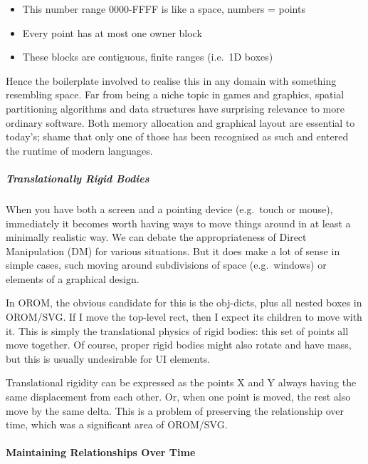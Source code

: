\documentclass[english,submission]{programming}
\begin{document}
\begin{itemize}
\tightlist
\item
  This number range 0000-FFFF is like a space, numbers = points
\item
  Every point has at most one owner block
\item
  These blocks are contiguous, finite ranges (i.e.~1D boxes)
\end{itemize}

Hence the boilerplate involved to realise this in any domain with
something resembling space. Far from being a niche topic in games and
graphics, spatial partitioning algorithms and data structures have
surprising relevance to more ordinary software. Both memory allocation
and graphical layout are essential to today's; shame that only one of
those has been recognised as such and entered the runtime of modern
languages.

\hypertarget{translationally-rigid-bodies}{%
\subparagraph{Translationally Rigid
Bodies}\label{translationally-rigid-bodies}}

When you have both a screen and a pointing device (e.g.~touch or mouse),
immediately it becomes worth having ways to move things around in at
least a minimally realistic way. We can debate the appropriateness of
Direct Manipulation (DM) for various situations. But it does make a lot
of sense in simple cases, such moving around subdivisions of space
(e.g.~windows) or elements of a graphical design.

In OROM, the obvious candidate for this is the obj-dicts, plus all
nested boxes in OROM/SVG. If I move the top-level rect, then I expect
its children to move with it. This is simply the translational physics
of rigid bodies: this set of points all move together. Of course, proper
rigid bodies might also rotate and have mass, but this is usually
undesirable for UI elements.

Translational rigidity can be expressed as the points X and Y always
having the same displacement from each other. Or, when one point is
moved, the rest also move by the same delta. This is a problem of
preserving the relationship over time, which was a significant area of
OROM/SVG.

\hypertarget{maintaining-relationships-over-time}{%
\paragraph{Maintaining Relationships Over
Time}\label{maintaining-relationships-over-time}}
\end{document}
